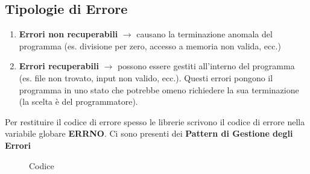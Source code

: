 \subsection{Tipologie di Errore}
\begin{enumerate}
    \item \textbf{Errori non recuperabili} $\rightarrow$ causano la terminazione anomala del programma (es. divisione per zero, accesso a memoria non valida, ecc.)
    \item \textbf{Errori recuperabili} $\rightarrow$ possono essere gestiti all'interno del programma (es. file non trovato, input non valido, ecc.). Questi errori
    pongono il programma in uno stato che potrebbe omeno richiedere la sua terminazione (la scelta è del programmatore).
\end{enumerate}
Per restituire il codice di errore spesso le librerie scrivono il codice di errore nella variabile globare \textbf{ERRNO}.
Ci sono presenti dei \textbf{Pattern di Gestione degli Errori}
\begin{figure}[H]
    \centering  
    \caption{Codice}
\end{figure}
